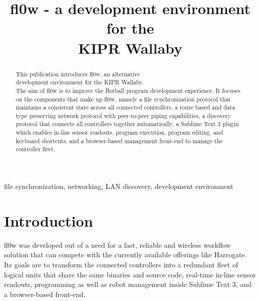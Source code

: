 \documentclass[conference]{IEEEtran}
\begin{document}
\title{fl0w - a development environment for the\\ KIPR Wallaby}
\author{
}
\maketitle


\begin{abstract}
This publication introduces fl0w\cite{fl0w:Philip Trauner}, an alternative\\ development environment for the KIPR Wallaby\cite{Wallaby Controller:KIPR}.\\ The aim of fl0w\cite{fl0w:Philip Trauner} is to improve the Botball program development experience. It focuses on the components that make up fl0w\cite{fl0w:Philip Trauner}, namely a file synchronization protocol that maintains a consistent state across all connected controllers, a route based and data type preserving network protocol with peer-to-peer piping capabilities, a discovery protocol that connects all controllers together automatically, a Sublime Text 3\cite{Sublime Text 3:Sublime HQ} plugin which enables in-line sensor readouts, program execution, program editing, and keyboard shortcuts, and a browser-based management front-end to manage the controller fleet.\\
\end{abstract}

\begin{IEEEkeywords}
file synchronization, networking, LAN discovery, development environment
\end{IEEEkeywords}



\section{Introduction}
fl0w\cite{fl0w:Philip Trauner} was developed out of a need for a fast, reliable and wireless workflow solution that can compete with the currently available offerings like Harrogate\cite{Harrogate:KIPR}. Its goals are to transform the connected controllers into a redundant fleet of logical units that share the same binaries and source code, real-time in-line sensor readouts, programming as well as robot management inside Sublime Text 3\cite{Sublime Text 3:Sublime HQ}, and a browser-based front-end.
\end{document}
